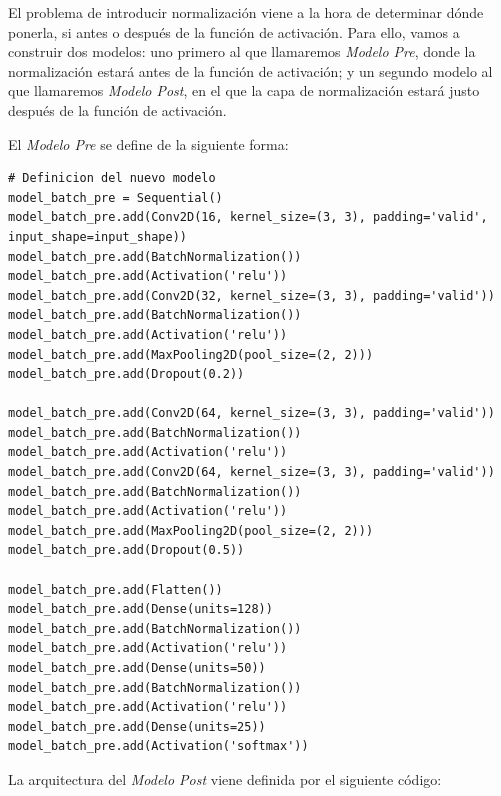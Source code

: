 \documentclass[11pt,a4paper]{article}
\begin{document}
El problema de introducir normalización viene a la hora de determinar dónde ponerla, si antes o después de
la función de activación. Para ello, vamos a construir dos modelos: uno primero al que llamaremos
\textit{Modelo Pre}, donde la normalización estará antes de la función de activación; y un segundo modelo
al que llamaremos \textit{Modelo Post}, en el que la capa de normalización estará justo después de la función
de activación.

El \textit{Modelo Pre} se define de la siguiente forma:

\begin{lstlisting}
# Definicion del nuevo modelo
model_batch_pre = Sequential()
model_batch_pre.add(Conv2D(16, kernel_size=(3, 3), padding='valid', input_shape=input_shape))
model_batch_pre.add(BatchNormalization())
model_batch_pre.add(Activation('relu'))
model_batch_pre.add(Conv2D(32, kernel_size=(3, 3), padding='valid'))
model_batch_pre.add(BatchNormalization())
model_batch_pre.add(Activation('relu'))
model_batch_pre.add(MaxPooling2D(pool_size=(2, 2)))
model_batch_pre.add(Dropout(0.2))

model_batch_pre.add(Conv2D(64, kernel_size=(3, 3), padding='valid'))
model_batch_pre.add(BatchNormalization())
model_batch_pre.add(Activation('relu'))
model_batch_pre.add(Conv2D(64, kernel_size=(3, 3), padding='valid'))
model_batch_pre.add(BatchNormalization())
model_batch_pre.add(Activation('relu'))
model_batch_pre.add(MaxPooling2D(pool_size=(2, 2)))
model_batch_pre.add(Dropout(0.5))

model_batch_pre.add(Flatten())
model_batch_pre.add(Dense(units=128))
model_batch_pre.add(BatchNormalization())
model_batch_pre.add(Activation('relu'))
model_batch_pre.add(Dense(units=50))
model_batch_pre.add(BatchNormalization())
model_batch_pre.add(Activation('relu'))
model_batch_pre.add(Dense(units=25))
model_batch_pre.add(Activation('softmax'))
\end{lstlisting}

La arquitectura del \textit{Modelo Post} viene definida por el siguiente código:
\end{document}
